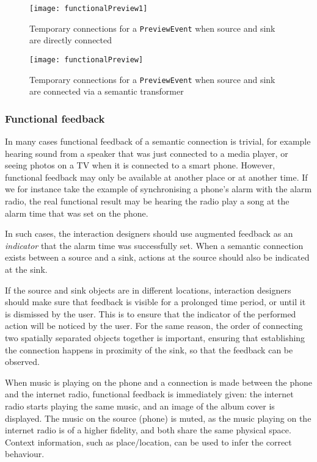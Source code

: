 \begin{figure}
\centerline{
\texttt{[image: functionalPreview1]}}
\caption{Temporary connections for a \texttt{PreviewEvent} when source and sink are directly connected}
\label{functionalPreview1}
\end{figure}

\begin{figure}
\centerline{
\texttt{[image: functionalPreview]}}
\caption{Temporary connections for a \texttt{PreviewEvent} when source and sink are connected via a semantic transformer}
\label{functionalPreview}
\end{figure}

\subsubsection{Functional feedback}
In many cases functional feedback of a semantic connection is trivial, for example hearing sound from a speaker that was just connected to a media player, or seeing photos on a TV when it is connected to a smart phone. However, functional feedback may only be available at another place or at another time. If we for instance take the example of synchronising a phone's alarm with the alarm radio, the real functional result may be hearing the radio play a song at the alarm time that was set on the phone. 

In such cases, the interaction designers should use augmented feedback as an \emph{indicator} that the alarm time was successfully set. When a semantic connection exists between a source and a sink, actions at the source should also be indicated at the sink. 

If the source and sink objects are in different locations, interaction designers should make sure that feedback is visible for a prolonged time period, or until it is dismissed by the user. This is to ensure that the indicator of the performed action will be noticed by the user. For the same reason, the order of connecting two spatially separated objects together is important, ensuring that establishing the connection happens in proximity of the sink, so that the feedback can be observed. 

\begin{example}
When music is playing on the phone and a connection is made between the phone and the internet radio, functional feedback is immediately given: the internet radio starts playing the same music, and an image of the album cover is displayed. The music on the source (phone) is muted, as the music playing on the internet radio is of a higher fidelity, and both share the same physical space. Context information, such as place/location, can be used to infer the correct behaviour.
\end{example}

